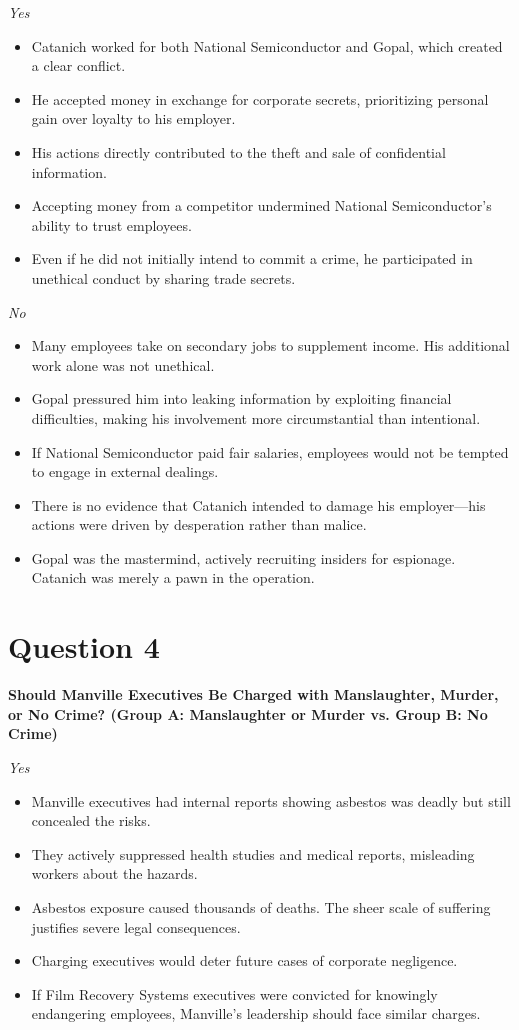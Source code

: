 \documentclass{article}
\begin{document}
\textit{Yes}
\begin{itemize}
    \item Catanich worked for both National Semiconductor and Gopal, which created a clear conflict.
    \item He accepted money in exchange for corporate secrets, prioritizing personal gain over loyalty to his employer.
    \item His actions directly contributed to the theft and sale of confidential information.
    \item Accepting money from a competitor undermined National Semiconductor’s ability to trust employees.
    \item Even if he did not initially intend to commit a crime, he participated in unethical conduct by sharing trade secrets.
\end{itemize}

\textit{No}
\begin{itemize}
    \item Many employees take on secondary jobs to supplement income. His additional work alone was not unethical.
    \item Gopal pressured him into leaking information by exploiting financial difficulties, making his involvement more circumstantial than intentional.
    \item If National Semiconductor paid fair salaries, employees would not be tempted to engage in external dealings.
    \item There is no evidence that Catanich intended to damage his employer—his actions were driven by desperation rather than malice.
    \item Gopal was the mastermind, actively recruiting insiders for espionage. Catanich was merely a pawn in the operation.
\end{itemize}

\section*{Question 4}
\textbf{Should Manville Executives Be Charged with Manslaughter, Murder, or No Crime? (Group A: Manslaughter or Murder vs. Group B: No Crime)}

\textit{Yes}
\begin{itemize}
    \item Manville executives had internal reports showing asbestos was deadly but still concealed the risks.
    \item They actively suppressed health studies and medical reports, misleading workers about the hazards.
    \item Asbestos exposure caused thousands of deaths. The sheer scale of suffering justifies severe legal consequences.
    \item Charging executives would deter future cases of corporate negligence.
    \item If Film Recovery Systems executives were convicted for knowingly endangering employees, Manville’s leadership should face similar charges.
\end{itemize}
\end{document}
